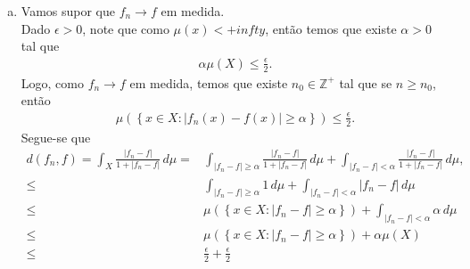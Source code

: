 \begin{homeworkProblem}[7]
\begin{solution}
\begin{enumerate}[a)]
\begin{itemize}
\begin{align*}
        \end{align*}
        Portanto usando a desigualdade anterior e a desigualdade triangular nos temos que
        \begin{align*}
          d(f,g)=\int \frac{|f-g|}{1+|f-g|}\,d\mu=&\int 1-\frac{1}{1+|f-g|}\,d\mu\\
          \leq & \int 1-\frac{1}{1+|f-h|+|h-g|}\,d\mu\\
          \leq & \int \frac{|f-h|+|h-g|}{1+|f-h|+|h-g|}\,d\mu\\
          \leq & \int \frac{|f-h|}{1+|f-h|+|h-g|}\,d\mu+\int \frac{|h-g|}{1+|f-h|+|h-g|}\,d\mu\\
          \leq & \int \frac{|f-h|}{1+|f-h|}\,d\mu+\int \frac{|h-g|}{1+|h-g|}\,d\mu\\
          \leq & d(f,h) + d(h,g).
        \end{align*}
        Pelo que temos que $d$ satisfaze a desigualdade triangular. 
    \end{itemize}
    Assim, temos que $d$ é uma métrica no conjunto das classes de equivalência de funções mensuráveis pela relação de igualdade $\mu$-q.t.p.
    \item Vamos supor que $f_n\to f$ em medida.\\
      Dado $\epsilon>0$, note que como $\mu(x)<+infty$, então temos que existe $\alpha>0$ tal que
      \begin{align*}
        \alpha\mu(X)\leq \frac{\epsilon}{2}.
      \end{align*}
      Logo, como $f_n\to f$ em medida, temos que existe $n_0\in\mathbb{Z}^{+}$ tal que se $n\geq n_0$, então
      \begin{align*}
        \mu\left( \left\{ x\in X:|f_n(x)-f(x)|\geq \alpha \right\} \right)\leq \frac{\epsilon}{2}.
      \end{align*}
      Segue-se que
      \begin{align*}
        d(f_n,f)=\int_{X}\frac{|f_n-f|}{1+|f_n-f|}\,d\mu=&\int_{|f_n-f|\geq \alpha}\frac{|f_n-f|}{1+|f_n-f|}\,d\mu+\int_{|f_n-f|<\alpha}\frac{|f_n-f|}{1+|f_n-f|}\,d\mu,\\
        \leq& \int_{|f_n-f|\geq\alpha}1\,d\mu +\int_{|f_n-f|<\alpha}|f_n-f|\,d\mu\\
        \leq& \mu\left( \left\{ x\in X:|f_n-f|\geq\alpha \right\} \right)+ \int_{|f_n-f|<\alpha}\alpha\,d\mu\\
        \leq& \mu\left( \left\{ x\in X:|f_n-f|\geq\alpha \right\} \right)+ \alpha\mu(X)\\
        \leq& \frac{\epsilon}{2}+\frac{\epsilon}{2}\\

\end{align*}
\end{enumerate}
\end{solution}
\end{homeworkProblem}
